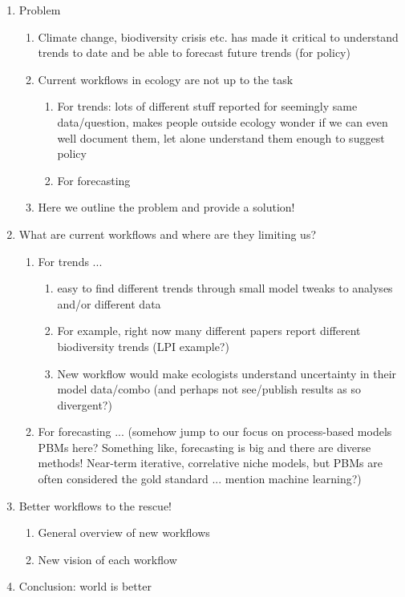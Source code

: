 \documentclass[11pt]{article}
\begin{document}
\begin{enumerate}
\item Problem
\begin{enumerate}
\item Climate change, biodiversity crisis etc. has made it critical to understand trends to date and be able to forecast future trends (for policy)
\item Current workflows in ecology are not up to the task
\begin{enumerate}
\item For trends: lots of different stuff reported for seemingly same data/question, makes people outside ecology wonder if we can even well document them, let alone understand them enough to suggest policy
\item For forecasting
\end{enumerate}
\item Here we outline the problem and provide a solution!
\end{enumerate}
\item What are current workflows and where are they limiting us?
\begin{enumerate}
\item For trends ...
\begin{enumerate}
\item easy to find different trends through small model tweaks to analyses and/or different data
\item For example, right now many different papers report different biodiversity trends (LPI example?)
\item New workflow would make ecologists understand uncertainty in their model data/combo (and perhaps not see/publish results as so divergent?)
\end{enumerate}
\item For forecasting ... (somehow jump to our focus on process-based models PBMs here? Something like, forecasting is big and there are diverse methods! Near-term iterative, correlative niche models, but PBMs are often considered the gold standard ... mention machine learning?)
\end{enumerate}
\item Better workflows to the rescue! 
\begin{enumerate}
\item General overview of new workflows
\item New vision of each workflow
\end{enumerate}
\item Conclusion: world is better
\end{enumerate}
\end{document}
